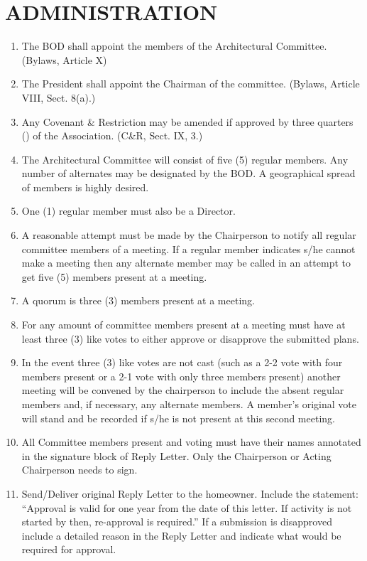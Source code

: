 \documentclass[10pt, letterpaper]{article}
\begin{document}
\section{ADMINISTRATION}
\begin{enumerate}
  \item The BOD shall appoint the members of the Architectural Committee.
    \hfill (Bylaws, Article X)
  \item The President shall appoint the Chairman of the committee.
    \hfill (Bylaws, Article VIII, Sect. 8(a).)
  \item Any Covenant \& Restriction may be amended if approved by three quarters (\textthreequarters) of the Association.
    \hfill (C\&R, Sect. IX, 3.)
  \item The Architectural Committee will consist of five (5) regular members. Any number of alternates may be designated by the BOD. A geographical spread of members is highly desired.
  \item One (1) regular member must also be a Director.
  \item A reasonable attempt must be made by the Chairperson to notify all regular committee members of a meeting.
    If a regular member indicates s/he cannot make a meeting then any alternate member may be called in an attempt to get five (5) members present at a meeting.
  \item A quorum is three (3) members present at a meeting.
  \item For any amount of committee members present at a meeting must have at least three (3) like votes to either approve or disapprove the submitted plans.
  \item In the event three (3) like votes are not cast (such as a 2-2 vote with four members present or a 2-1 vote with only three members present) another meeting will be convened by the chairperson to include the absent regular members and, if necessary, any alternate members.
    A member's original vote will stand and be recorded if s/he is not present at this second meeting.
  \item All Committee members present and voting must have their names annotated in the signature block of Reply Letter.
    Only the Chairperson or Acting Chairperson needs to sign.
  \item Send/Deliver original Reply Letter to the homeowner.
    Include the statement:
    ``Approval is valid for one year from the date of this letter. If activity is not started by then, re-approval is required.''
    If a submission is disapproved include a detailed reason in the Reply Letter and indicate what would be required for approval.

\end{enumerate}
\end{document}
